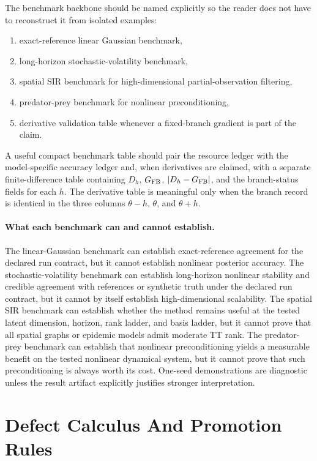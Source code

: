 The benchmark backbone should be named explicitly so the reader does not have to
reconstruct it from isolated examples:
\begin{enumerate}[label=(V\arabic*), leftmargin=0.34in]
  \item exact-reference linear Gaussian benchmark,
  \item long-horizon stochastic-volatility benchmark,
  \item spatial SIR benchmark for high-dimensional partial-observation filtering,
  \item predator-prey benchmark for nonlinear preconditioning,
  \item derivative validation table whenever a fixed-branch gradient is part of
  the claim.
\end{enumerate}
A useful compact benchmark table should pair the resource ledger with the
model-specific accuracy ledger and, when derivatives are claimed, with a separate
finite-difference table containing \(D_h\), \(G_{\rm FB}\), \(|D_h-G_{\rm FB}|\),
and the branch-status fields for each \(h\).  The derivative table is meaningful
only when the branch record is identical in the three columns
\(\theta-h\), \(\theta\), and \(\theta+h\).

\paragraph{What each benchmark can and cannot establish.}
The linear-Gaussian benchmark can establish exact-reference agreement for the
declared run contract, but it cannot establish nonlinear posterior accuracy.  The
stochastic-volatility benchmark can establish long-horizon nonlinear stability and
credible agreement with references or synthetic truth under the declared run
contract, but it cannot by itself establish high-dimensional scalability.  The
spatial SIR benchmark can establish whether the method remains useful at the
tested latent dimension, horizon, rank ladder, and basis ladder, but it cannot
prove that all spatial graphs or epidemic models admit moderate TT rank.  The
predator-prey benchmark can establish that nonlinear preconditioning yields a
measurable benefit on the tested nonlinear dynamical system, but it cannot prove
that such preconditioning is always worth its cost.  One-seed demonstrations are
diagnostic unless the result artifact explicitly justifies stronger
interpretation.

\section{Defect Calculus And Promotion Rules}
\label{sec:bf-hd-promotion-logic}

